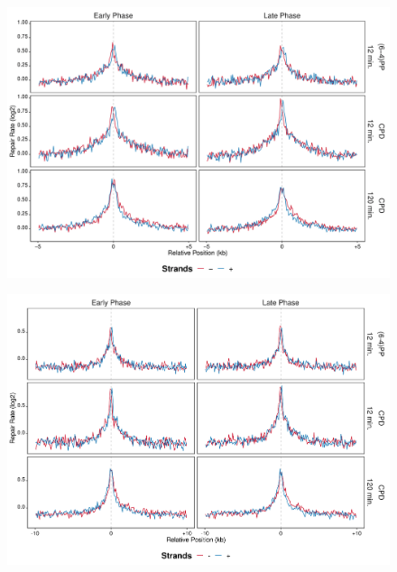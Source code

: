 \begin{figure}[H]
\begin{center}
\includegraphics[width=\textwidth]{Chapters/7_appendix/figures/supfig51}
\caption[]{}
\label{supfig:}
\end{center}
\end{figure}

\begin{figure}[H]
\begin{center}
\includegraphics[width=\textwidth]{Chapters/7_appendix/figures/supfig52}
\caption[]{}
\label{supfig:}
\end{center}
\end{figure}

